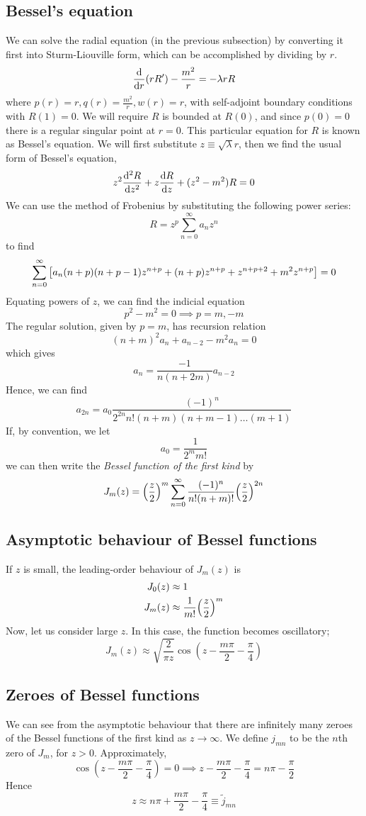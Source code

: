 \subsection{Bessel's equation}
We can solve the radial equation (in the previous subsection) by converting it first into Sturm-Liouville form, which can be accomplished by dividing by \( r \).
\[
	\dv{r} \qty(r R') - \frac{m^2}{r} = -\lambda r R
\]
where \( p(r) = r, q(r) = \frac{m^2}{r}, w(r) = r \), with self-adjoint boundary conditions with \( R(1) = 0 \).
We will require \( R \) is bounded at \( R(0) \), and since \( p(0) = 0 \) there is a regular singular point at \( r = 0 \).
This particular equation for \( R \) is known as Bessel's equation.
We will first substitute \( z \equiv \sqrt{\lambda} r \), then we find the usual form of Bessel's equation,
\[
	z^2 \dv[2]{R}{z} + z \dv{R}{z} + (z^2 - m^2)R = 0
\]
We can use the method of Frobenius by substituting the following power series:
\[
	R = z^p \sum_{n=0}^\infty a_n z^n
\]
to find
\[
	\sum_{n=0}^\infty \qty[ a_n (n+p)(n+p-1) z^{n+p} + (n+p) z^{n+p} + z^{n+p+2} + m^2 z^{n+p} ] = 0
\]
Equating powers of \( z \), we can find the indicial equation
\[
	p^2 - m^2 = 0 \implies p = m, -m
\]
The regular solution, given by \( p = m \), has recursion relation
\[
	(n+m)^2 a_n + a_{n-2} - m^2 a_n = 0
\]
which gives
\[
	a_n = \frac{-1}{n(n+2m)} a_{n-2}
\]
Hence, we can find
\[
	a_{2n} = a_0 \frac{(-1)^n}{2^{2n} n!
		(n+m)(n+m-1) \dots (m+1)}
\]
If, by convention, we let
\[
	a_0 = \frac{1}{2^m m!}
\]
we can then write the \textit{Bessel function of the first kind} by
\[
	J_m(z) = \qty(\frac{z}{2})^m \sum_{n=0}^\infty \frac{(-1)^n}{n!
		(n+m)!} \qty(\frac{z}{2})^{2n}
\]

\subsection{Asymptotic behaviour of Bessel functions}
If \( z \) is small, the leading-order behaviour of \( J_m(z) \) is
\begin{align*}
	J_0(z) & \approx 1                                \\
	J_m(z) & \approx \frac{1}{m!} \qty(\frac{z}{2})^m
\end{align*}
Now, let us consider large \( z \).
In this case, the function becomes oscillatory;
\[
	J_m(z) \approx \sqrt{\frac{2}{\pi z}} \cos(z - \frac{m \pi}{2} - \frac{\pi}{4})
\]

\subsection{Zeroes of Bessel functions}
We can see from the asymptotic behaviour that there are infinitely many zeroes of the Bessel functions of the first kind as \( z \to \infty \).
We define \( j_{mn} \) to be the \( n \)th zero of \( J_m \), for \( z > 0 \).
Approximately,
\[
	\cos(z - \frac{m \pi}{2} - \frac{\pi}{4}) = 0 \implies z - \frac{m \pi}{2} - \frac{\pi}{4} = n \pi - \frac{\pi}{2}
\]
Hence
\[
	z \approx n \pi + \frac{m \pi}{2} - \frac{\pi}{4} \equiv \widetilde j_{mn}
\]

